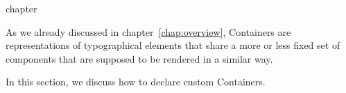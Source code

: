 \begin{Heading}{chapter}
\end{Heading}


As we already discussed in chapter~\ref{chap:overview},
Containers are representations of typographical
elements that share a more or less fixed set of components that are
supposed to be rendered in a similar way.

In this section, we discuss how to declare custom Containers.

